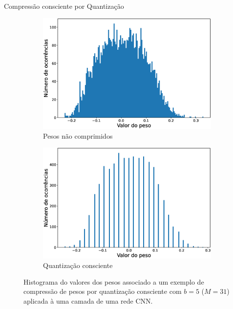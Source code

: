 \begin{frame}{Compressão consciente por Quantização}
    \begin{figure}[H]
  \centering

  \begin{subfigure}[b]{0.49\textwidth}
    \includegraphics[width=\textwidth]{figuras/hist_weights.eps}
    \caption{Pesos não comprimidos}
    \label{fig:subfig1}
  \end{subfigure}
  \hfill
  \begin{subfigure}[b]{0.49\textwidth}
    \includegraphics[width=\textwidth]{figuras/hist_quant.eps}
    \caption{Quantização consciente}
    \label{fig:subfig2}
  \end{subfigure}

  \caption{Histograma do valores dos pesos associado a um exemplo de compressão de pesos por quantização consciente com $b=5$ ($M=31$) aplicada à uma camada de uma rede CNN.}
  \label{fig:main}
\end{figure}
\end{frame}

